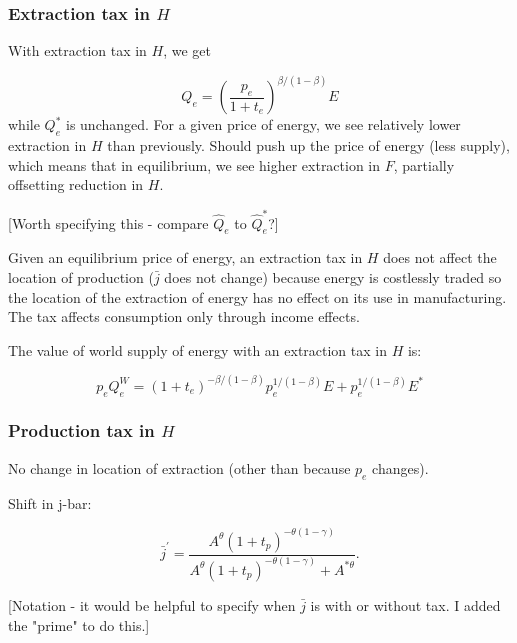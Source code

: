 \documentclass[notitlepage,12pt]{article}
\begin{document}
\subsubsection{Extraction tax in $H$}

With extraction tax in $H$, we get

\begin{equation*}
Q_{e}=\left( \frac{p_{e}}{1+t_{e}}\right) ^{\beta /\left( 1-\beta \right) }E
\end{equation*}%
while $Q_{e}^{\ast }$ is unchanged. For a given price of energy, we see
relatively lower extraction in $H$ than previously. Should push up the price
of energy (less supply), which means that in equilibrium, we see higher
extraction in $F$, partially offsetting reduction in $H$.

[Worth specifying this - compare $\hat{Q}_{e}$ to $\hat{Q}_{e}^{\ast }$?]

Given an equilibrium price of energy, an extraction tax in $H$ does not
affect the location of production ($\bar{j}$ does not change) because energy
is costlessly traded so the location of the extraction of energy has no
effect on its use in manufacturing. The tax affects consumption only through
income effects.

The value of world supply of energy with an extraction tax in $H$ is:

\begin{equation}
p_{e}Q_{e}^{W}=\left( 1+t_{e}\right) ^{-\beta /\left( 1-\beta \right)
}p_{e}^{1/\left( 1-\beta \right) }E+p_{e}^{1/\left( 1-\beta \right) }E^{\ast
}  \label{Supply of energy with extraction tax in H}
\end{equation}

\subsubsection{Production tax in $H$}

No change in location of extraction (other than because $p_{e}$ changes). 

Shift in j-bar:

\begin{equation*}
\bar{j}^{\prime }=\frac{A^{\theta }\left( 1+t_{p}\right) ^{-\theta \left(
1-\gamma \right) }}{A^{\theta }\left( 1+t_{p}\right) ^{-\theta \left(
1-\gamma \right) }+A^{\ast \theta }}.
\end{equation*}

[Notation - it would be helpful to specify when $\bar{j}$ is with or without
tax. I added the "prime" to do this.]
\end{document}
